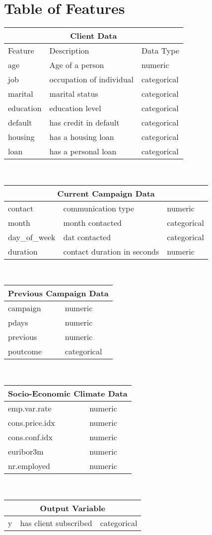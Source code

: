 \documentclass[a4paper, oneside, 11pt]{article}
\begin{document}
    \section{Table of Features}
    \begin{tabular}{ |p{3cm}||p{6cm}|p{2cm}|}
        \hline
        \multicolumn{3}{|c|}{Client Data} \\
        \hline
        Feature & Description & Data Type\\
        \hline
        age & Age of a person & numeric\\ 
        job & occupation of individual & categorical\\
        marital & marital status & categorical\\
        education & education level & categorical\\
        default & has credit in default & categorical\\
        housing & has a housing loan & categorical\\
        loan  & has a personal loan & categorical\\
        \hline
    \end{tabular}\\
    \begin{tabular}{ |p{3cm}||p{6cm}|p{2cm}|}
        \hline
        \multicolumn{3}{|c|}{Current Campaign Data} \\
        \hline
        contact & communication type & numeric\\ 
        month & month contacted & categorical\\
        day\_of\_week & dat contacted & categorical\\
        duration & contact duration in seconds & numeric\\
        \hline
    \end{tabular}\\
    \begin{tabular}{ |p{3cm}||p{6cm}|p{2cm}|}
        \hline
        \multicolumn{3}{|c|}{Previous Campaign Data} \\
        \hline
        campaign & & numeric\\ 
        pdays &  & numeric\\
        previous &  & numeric\\
        poutcome &  & categorical\\
        \hline
    \end{tabular}\\
    \begin{tabular}{ |p{3cm}||p{6cm}|p{2cm}|}
        \hline
        \multicolumn{3}{|c|}{Socio-Economic Climate Data} \\
        \hline
        emp.var.rate & & numeric\\ 
        cons.price.idx &  & numeric\\
        cons.conf.idx &  & numeric\\
        euribor3m &  & numeric\\
        nr.employed &  & numeric\\
        \hline
    \end{tabular}\\
    \begin{tabular}{ |p{3cm}||p{6cm}|p{2cm}|}
        \hline
        \multicolumn{3}{|c|}{Output Variable} \\
        \hline
        y & has client subscribed & categorical\\ 
        \hline
    \end{tabular}
\end{document}
